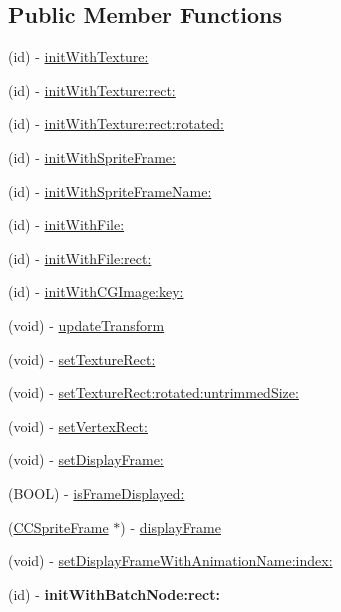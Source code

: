 \subsection*{Public Member Functions}
\begin{DoxyCompactItemize}
\item 
(id) -\/ \hyperlink{class_c_c_sprite_a1e6e24de9810aaf60d1557b31947c8c3}{init\-With\-Texture\-:}
\item 
(id) -\/ \hyperlink{class_c_c_sprite_a7de834b5060b6d5ae783aacf925fc78a}{init\-With\-Texture\-:rect\-:}
\item 
(id) -\/ \hyperlink{class_c_c_sprite_a6f1ee281599914961b4073c738eff1c8}{init\-With\-Texture\-:rect\-:rotated\-:}
\item 
(id) -\/ \hyperlink{class_c_c_sprite_a569cc268cf43accd6b2191452837c10c}{init\-With\-Sprite\-Frame\-:}
\item 
(id) -\/ \hyperlink{class_c_c_sprite_a331881a2a3bda9eb5ac8e71419c799ca}{init\-With\-Sprite\-Frame\-Name\-:}
\item 
(id) -\/ \hyperlink{class_c_c_sprite_aee29f40a3d60bc81ce729af4887380ca}{init\-With\-File\-:}
\item 
(id) -\/ \hyperlink{class_c_c_sprite_ab94a64501ea3dfd60cf4b46b600d1d38}{init\-With\-File\-:rect\-:}
\item 
(id) -\/ \hyperlink{class_c_c_sprite_a0ba4f6f3484ee5940a88ab35696583ce}{init\-With\-C\-G\-Image\-:key\-:}
\item 
(void) -\/ \hyperlink{class_c_c_sprite_a6a502b8bf605bf8bb42bd87e24b7924e}{update\-Transform}
\item 
(void) -\/ \hyperlink{class_c_c_sprite_a40f10e331d95a9b8a62d846cc0da48b4}{set\-Texture\-Rect\-:}
\item 
(void) -\/ \hyperlink{class_c_c_sprite_a737e6f7fb561d41bf54939c94fdeb169}{set\-Texture\-Rect\-:rotated\-:untrimmed\-Size\-:}
\item 
(void) -\/ \hyperlink{class_c_c_sprite_a282842273975721399dc5bc6e651ac16}{set\-Vertex\-Rect\-:}
\item 
(void) -\/ \hyperlink{class_c_c_sprite_ae41c556a12991defd766670eae6ba700}{set\-Display\-Frame\-:}
\item 
(B\-O\-O\-L) -\/ \hyperlink{class_c_c_sprite_a8ae05177e6e0669821e6cfcd1124bd14}{is\-Frame\-Displayed\-:}
\item 
(\hyperlink{interface_c_c_sprite_frame}{C\-C\-Sprite\-Frame} $\ast$) -\/ \hyperlink{class_c_c_sprite_aaa4ad7b1b8abc6aecb3709e22ebb9126}{display\-Frame}
\item 
(void) -\/ \hyperlink{class_c_c_sprite_ab6164fd24d33f6b6b13a45f5ad8f184b}{set\-Display\-Frame\-With\-Animation\-Name\-:index\-:}
\item 
\hypertarget{class_c_c_sprite_a0823eeae3e301235bd1043e1e717b48e}{(id) -\/ {\bfseries init\-With\-Batch\-Node\-:rect\-:}}\label{class_c_c_sprite_a0823eeae3e301235bd1043e1e717b48e}


\end{DoxyCompactItemize}
